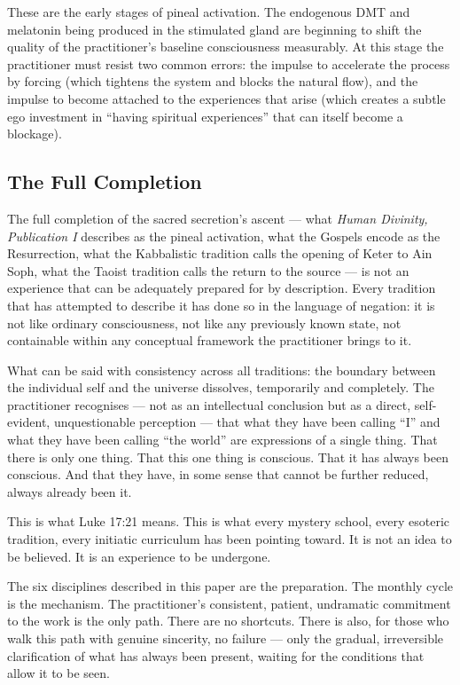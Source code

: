 \documentclass[12pt, a4paper]{article}
\begin{document}
These are the early stages of pineal activation. The endogenous DMT and
melatonin being produced in the stimulated gland are beginning to shift the
quality of the practitioner's baseline consciousness measurably. At this stage
the practitioner must resist two common errors: the impulse to accelerate the
process by forcing (which tightens the system and blocks the natural flow), and
the impulse to become attached to the experiences that arise (which creates a
subtle ego investment in ``having spiritual experiences'' that can itself
become a blockage).

\subsection{The Full Completion}

The full completion of the sacred secretion's ascent — what \emph{Human
Divinity, Publication I} describes as the pineal activation, what the Gospels
encode as the Resurrection, what the Kabbalistic tradition calls the opening
of Keter to Ain Soph, what the Taoist tradition calls the return to the source
— is not an experience that can be adequately prepared for by description.
Every tradition that has attempted to describe it has done so in the language
of negation: it is not like ordinary consciousness, not like any previously
known state, not containable within any conceptual framework the practitioner
brings to it.

What can be said with consistency across all traditions: the boundary between
the individual self and the universe dissolves, temporarily and completely.
The practitioner recognises — not as an intellectual conclusion but as a
direct, self-evident, unquestionable perception — that what they have been
calling ``I'' and what they have been calling ``the world'' are expressions of
a single thing. That there is only one thing. That this one thing is conscious.
That it has always been conscious. And that they have, in some sense that
cannot be further reduced, always already been it.

This is what Luke 17:21 means. This is what every mystery school, every
esoteric tradition, every initiatic curriculum has been pointing toward. It is
not an idea to be believed. It is an experience to be undergone.

The six disciplines described in this paper are the preparation. The monthly
cycle is the mechanism. The practitioner's consistent, patient, undramatic
commitment to the work is the only path. There are no shortcuts. There is also,
for those who walk this path with genuine sincerity, no failure — only the
gradual, irreversible clarification of what has always been present, waiting
for the conditions that allow it to be seen.
\end{document}
